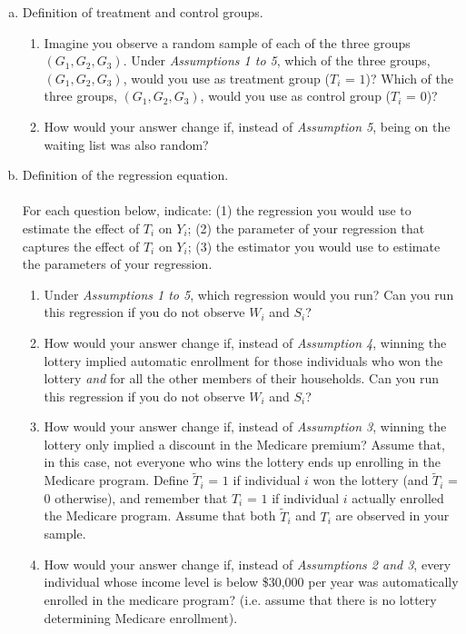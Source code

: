 \documentclass[11pt,letterpaper]{article}
\begin{document}
\begin{enumerate}[(a)]
	\item Definition of treatment and control groups.
	\begin{enumerate}[1.]
		\item Imagine you observe a random sample of each of the three groups $(G_{1},G_{2},G_{3})$. Under \textit{Assumptions 1 to 5}, which of the three groups, $(G_{1},G_{2},G_{3})$, would you use as treatment group ($T_{i}$ = $1$)? Which of the three groups, $(G_{1},G_{2},G_{3})$, would you use as control group ($T_{i}$ = $0$)?
		\item How would your answer change if, instead of \textit{Assumption 5}, being on the waiting list was also random?
	\end{enumerate}
	\item Definition of the regression equation.\\\\
	For each question below, indicate: (1) the regression you would use to estimate the effect of $T_{i}$ on $Y_{i}$; (2) the parameter of your regression that captures the effect of $T_{i}$ on $Y_{i}$; (3) the estimator you would use to estimate the parameters of your regression.
	\begin{enumerate}[1.]
		\item  Under \textit{Assumptions 1 to 5}, which regression would you run? Can you run this regression if you do not observe $W_{i}$ and $S_{i}$?
		\item  How would your answer change if, instead of \textit{Assumption 4}, winning the lottery implied automatic enrollment for those individuals who won the lottery \textit{and} for all the other members of their households. Can you run this regression if you do not observe $W_{i}$ and $S_{i}$?
		\item How would your answer change if, instead of \textit{Assumption 3}, winning the lottery only implied a discount in the Medicare premium? Assume that, in this case, not everyone who wins the lottery ends up enrolling in the Medicare program. Define $\tilde{T}_{i}$ = $1$ if individual $i$ won the lottery (and $\tilde{T}_{i}$ = $0$ otherwise), and remember that $T_{i}$ = $1$ if individual $i$ actually enrolled the Medicare program. Assume that both $\tilde{T}_{i}$ and  $T_{i}$ are observed in your sample.
		\item How would your answer change if, instead of \textit{Assumptions 2 and 3}, every individual whose income level is below \$30,000 per year was automatically enrolled in the medicare program? (i.e. assume that there is no lottery determining Medicare enrollment).
	\end{enumerate}
\end{enumerate}
\end{document}

